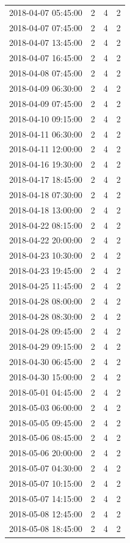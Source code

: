 \begin{tabular}{lrrr}
2018-04-07 05:45:00 & 2 & 4 & 2 \\
2018-04-07 07:45:00 & 2 & 4 & 2 \\
2018-04-07 13:45:00 & 2 & 4 & 2 \\
2018-04-07 16:45:00 & 2 & 4 & 2 \\
2018-04-08 07:45:00 & 2 & 4 & 2 \\
2018-04-09 06:30:00 & 2 & 4 & 2 \\
2018-04-09 07:45:00 & 2 & 4 & 2 \\
2018-04-10 09:15:00 & 2 & 4 & 2 \\
2018-04-11 06:30:00 & 2 & 4 & 2 \\
2018-04-11 12:00:00 & 2 & 4 & 2 \\
2018-04-16 19:30:00 & 2 & 4 & 2 \\
2018-04-17 18:45:00 & 2 & 4 & 2 \\
2018-04-18 07:30:00 & 2 & 4 & 2 \\
2018-04-18 13:00:00 & 2 & 4 & 2 \\
2018-04-22 08:15:00 & 2 & 4 & 2 \\
2018-04-22 20:00:00 & 2 & 4 & 2 \\
2018-04-23 10:30:00 & 2 & 4 & 2 \\
2018-04-23 19:45:00 & 2 & 4 & 2 \\
2018-04-25 11:45:00 & 2 & 4 & 2 \\
2018-04-28 08:00:00 & 2 & 4 & 2 \\
2018-04-28 08:30:00 & 2 & 4 & 2 \\
2018-04-28 09:45:00 & 2 & 4 & 2 \\
2018-04-29 09:15:00 & 2 & 4 & 2 \\
2018-04-30 06:45:00 & 2 & 4 & 2 \\
2018-04-30 15:00:00 & 2 & 4 & 2 \\
2018-05-01 04:45:00 & 2 & 4 & 2 \\
2018-05-03 06:00:00 & 2 & 4 & 2 \\
2018-05-05 09:45:00 & 2 & 4 & 2 \\
2018-05-06 08:45:00 & 2 & 4 & 2 \\
2018-05-06 20:00:00 & 2 & 4 & 2 \\
2018-05-07 04:30:00 & 2 & 4 & 2 \\
2018-05-07 10:15:00 & 2 & 4 & 2 \\
2018-05-07 14:15:00 & 2 & 4 & 2 \\
2018-05-08 12:45:00 & 2 & 4 & 2 \\
2018-05-08 18:45:00 & 2 & 4 & 2 \\

\end{tabular}
